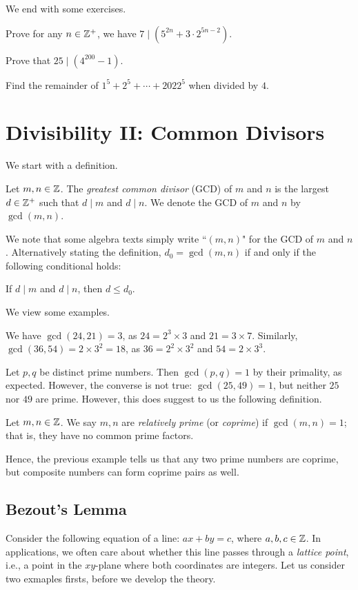 \documentclass{article}
\begin{document}
We end with some exercises.
\begin{exercise}
Prove for any $n\in\mathbb Z^+$, we have $7\mid (5^{2n} + 3\cdot 2^{5n-2})$.
\end{exercise}
\begin{exercise}
Prove that $25\mid (4^{200}-1)$.
\end{exercise}
\begin{exercise}
Find the remainder of $1^5 + 2^5 + \cdots + 2022^5$ when divided by $4$.
\end{exercise}

\section{Divisibility II: Common Divisors}
We start with a definition.
\begin{definition}\label{gcd}
Let $m, n\in\mathbb Z$. The \textit{greatest common divisor} (GCD) of $m$ and $n$ is the largest $d\in \mathbb Z^+$ such that $d\mid m$ and $d\mid n$. We denote the GCD of $m$ and $n$ by $\gcd(m, n)$.
\end{definition}
We note that some algebra texts simply write ``$(m, n)$" for the GCD of $m$ and $n$. Alternatively stating the definition, $d_0 = \gcd(m, n)$ if and only if the following conditional holds:
\begin{center}
If $d\mid m$ and $d\mid n$, then $d\leq d_0$.
\end{center}
We view some examples.
\begin{example}
We have $\gcd(24, 21) = 3$, as $24 = 2^3\times 3$ and $21 = 3\times 7$. Similarly, $\gcd(36, 54) = 2\times 3^2 = 18$, as $36 = 2^2\times 3^2$ and $54 = 2\times 3^3$.
\end{example}
\begin{example}
Let $p, q$ be distinct prime numbers. Then $\gcd(p, q) = 1$ by their primality, as expected. However, the converse is not true: $\gcd(25, 49) = 1$, but neither $25$ nor $49$ are prime. However, this does suggest to us the following definition.
\end{example}
\begin{definition}
Let $m,n\in\mathbb Z$. We say $m,n$ are \textit{relatively prime} (or \textit{coprime}) if $\gcd(m, n) = 1$; that is, they have no common prime factors.
\end{definition}

Hence, the previous example tells us that any two prime numbers are coprime, but composite numbers can form coprime pairs as well.
\newpage
\subsection*{Bezout's Lemma}
Consider the following equation of a line: $ax + by = c$, where $a,b,c\in\mathbb Z$. In applications, we often care about whether this line passes through a \textit{lattice point}, i.e., a point in the $xy$-plane where both coordinates are integers. Let us consider two exmaples firsts, before we develop the theory.
\end{document}
